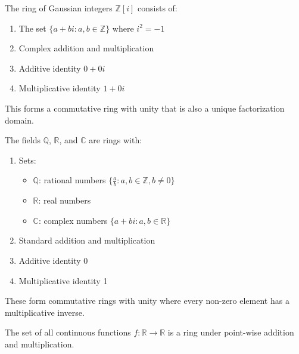   \begin{definition}
    The ring of Gaussian integers $\mathbb{Z}[i]$ consists of:
    \begin{enumerate}
      \item The set $\{a + bi : a,b \in \mathbb{Z}\}$ where $i^2 = -1$
      \item Complex addition and multiplication
      \item Additive identity $0 + 0i$
      \item Multiplicative identity $1 + 0i$
    \end{enumerate}
    This forms a commutative ring with unity that is also a unique factorization domain.
  \end{definition}

  \begin{definition}
    The fields $\mathbb{Q}$, $\mathbb{R}$, and $\mathbb{C}$ are rings with:
    \begin{enumerate}
      \item Sets: 
        \begin{itemize}
          \item $\mathbb{Q}$: rational numbers $\{\frac{a}{b} : a,b \in \mathbb{Z}, b \neq 0\}$
          \item $\mathbb{R}$: real numbers
          \item $\mathbb{C}$: complex numbers $\{a + bi : a,b \in \mathbb{R}\}$
        \end{itemize}
      \item Standard addition and multiplication
      \item Additive identity 0
      \item Multiplicative identity 1
    \end{enumerate}
    These form commutative rings with unity where every non-zero element has a multiplicative inverse.
  \end{definition}

  \begin{definition}
    The set of all continuous functions $f: \mathbb{R} \rightarrow \mathbb{R}$ is a ring under point-wise addition and multiplication. 
  \end{definition}

